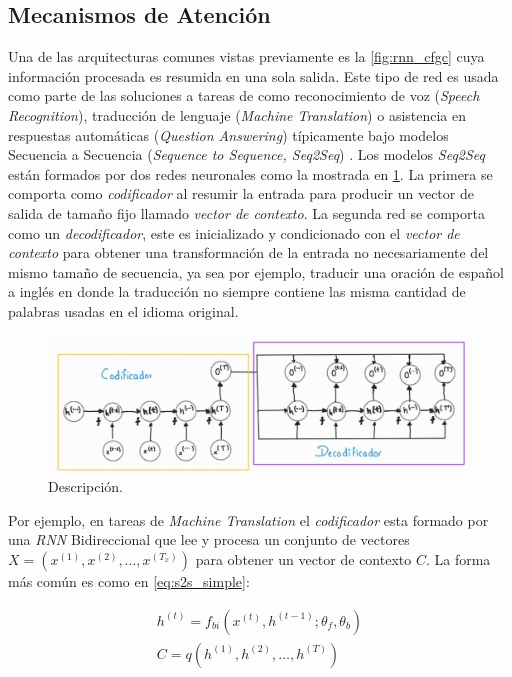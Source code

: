 \subsection{Mecanismos de Atención}

Una de las arquitecturas comunes vistas previamente es la \ref{fig:rnn_cfgc} cuya información
procesada es resumida en una sola salida. Este tipo de red es usada como parte de las soluciones a
tareas de como reconocimiento de voz (\textit{Speech Recognition}), traducción de lenguaje
(\textit{Machine Translation}) o asistencia en respuestas automáticas (\textit{Question Answering})
típicamente bajo modelos Secuencia a Secuencia (\textit{Sequence to Sequence, Seq2Seq})
\cite{DBLP:journals/corr/ChoMGBSB14}. Los modelos
\textit{Seq2Seq} están formados por dos redes neuronales como la mostrada en \ref{fig:seq2seq}. La
primera se comporta como \textit{codificador} al resumir la entrada para producir un vector de salida
de tamaño fijo llamado \textit{vector de contexto}. La segunda red se comporta como un
\textit{decodificador}, este es inicializado y condicionado con el
\textit{vector de contexto} para obtener una transformación de la entrada no necesariamente del
mismo tamaño de secuencia, ya sea por ejemplo, traducir una oración de español a inglés en donde la
traducción no siempre contiene las misma cantidad de palabras usadas en el idioma original.

\begin{figure}[ht!]
    \centering
    \includegraphics[width=1.0 \textwidth]{Chapters/1. Transformer/Figures/rnn/seq2seq.jpg}
    \caption{Descripción.}
    \label{fig:seq2seq}
\end{figure}

Por ejemplo, en tareas de \textit{Machine Translation} el \textit{codificador} esta formado por una
\textit{RNN} Bidireccional que lee y procesa un conjunto de
vectores $X = (x^{(1)}, x^{(2)}, \dots, x^{(T_x)})$ para obtener un vector de contexto $C$. La forma
más común es como en \ref{eq:s2s_simple}:

\begin{equation}
    \begin{split}
        h^{(t)} = f_{bi}(x^{(t)}, h^{(t-1)}; \theta_{f}, \theta_{b}) \\
        C = q({h^{(1)}, h^{(2)}, \dots, h^{(T)}})
    \end{split}
    \label{eq:s2s_simple}
\end{equation}

